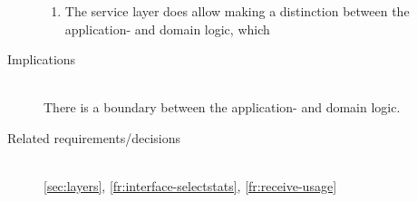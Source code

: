 \begin{description}
\begin{enumerate}
\item The service layer does allow making a distinction between the application- and domain logic, which 
\end{enumerate}

\item [Implications]~\\
There is a boundary between the application- and domain logic.

\item [Related requirements/decisions]~\\
\ref{sec:layers}, \ref{fr:interface-selectstats}, \ref{fr:receive-usage}



\end{description}


